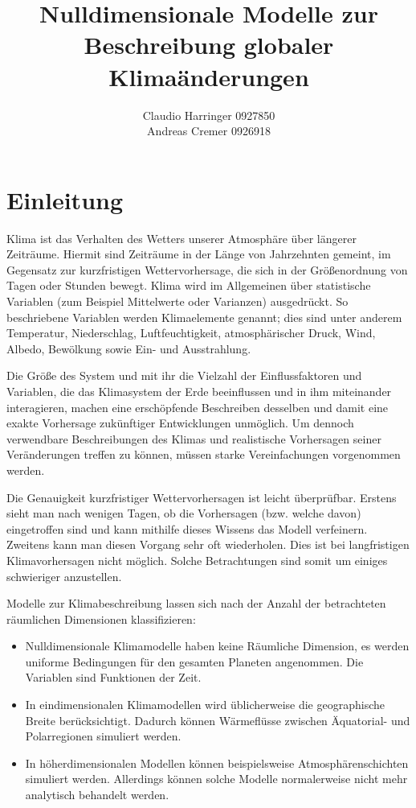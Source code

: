 \documentclass[]{report}
\title{Nulldimensionale Modelle zur Beschreibung globaler Klimaänderungen}
\author{Claudio Harringer 0927850 \\ Andreas Cremer 0926918}
\begin{document}
\maketitle
\tableofcontents
\chapter{Einleitung} 
	Klima ist das Verhalten des Wetters unserer Atmosphäre über längerer Zeiträume. Hiermit sind Zeiträume in der Länge von Jahrzehnten gemeint, im Gegensatz zur kurzfristigen Wettervorhersage, die sich in der Größenordnung von Tagen oder Stunden bewegt. Klima wird im Allgemeinen über statistische Variablen (zum Beispiel Mittelwerte oder Varianzen) ausgedrückt. So beschriebene Variablen werden Klimaelemente genannt; dies sind unter anderem Temperatur, Niederschlag, Luftfeuchtigkeit, atmosphärischer Druck, Wind, Albedo, Bewölkung sowie Ein- und Ausstrahlung.\par\bigskip
	Die Größe des System und mit ihr die Vielzahl der Einflussfaktoren und Variablen, die das Klimasystem der Erde beeinflussen und in ihm miteinander interagieren, machen eine erschöpfende Beschreiben desselben und damit eine exakte Vorhersage zukünftiger Entwicklungen unmöglich. Um dennoch verwendbare Beschreibungen des Klimas und realistische Vorhersagen seiner Veränderungen treffen zu können, müssen starke Vereinfachungen vorgenommen werden.\par\bigskip
	Die Genauigkeit kurzfristiger Wettervorhersagen ist leicht überprüfbar. Erstens sieht man nach wenigen Tagen, ob die Vorhersagen (bzw. welche davon) eingetroffen sind und kann mithilfe dieses Wissens das Modell verfeinern. Zweitens kann man diesen Vorgang sehr oft wiederholen. Dies ist bei langfristigen Klimavorhersagen nicht möglich. Solche Betrachtungen sind somit um einiges schwieriger anzustellen. \par\bigskip
	Modelle zur Klimabeschreibung lassen sich nach der Anzahl der betrachteten räumlichen Dimensionen klassifizieren:
	\begin{itemize}
		\item Nulldimensionale Klimamodelle haben keine Räumliche Dimension, es werden uniforme Bedingungen für den gesamten Planeten angenommen. Die Variablen sind Funktionen der Zeit.
		\item In eindimensionalen Klimamodellen wird üblicherweise die geographische Breite berücksichtigt. Dadurch können Wärmeflüsse zwischen Äquatorial- und Polarregionen simuliert werden.
		\item In höherdimensionalen Modellen können beispielsweise Atmosphärenschichten simuliert werden. Allerdings können solche Modelle normalerweise nicht mehr analytisch behandelt werden.
	\end{itemize}
	
\end{document}
